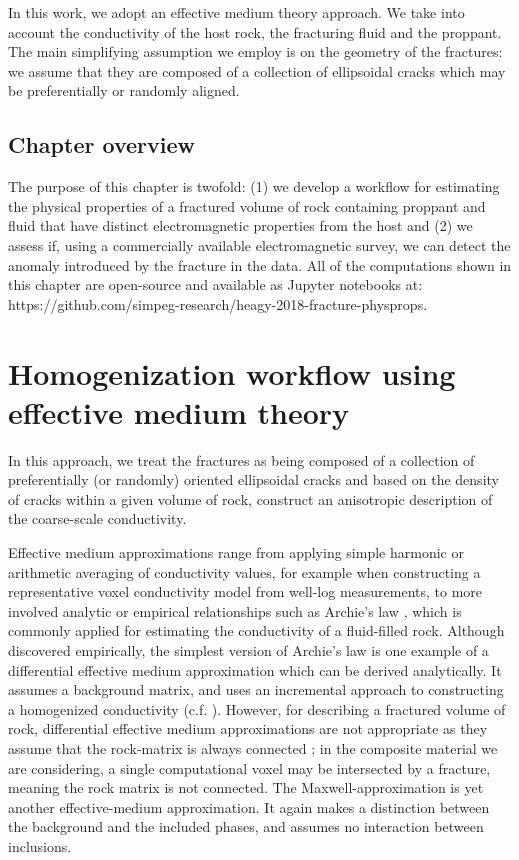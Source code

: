 In this work, we adopt an effective medium theory approach. We take into account the conductivity of the host rock, the fracturing fluid and the proppant. The main simplifying assumption we employ is on the geometry of the fractures: we assume that they are composed of a collection of ellipsoidal cracks which may be preferentially or randomly aligned.
\subsection{Chapter overview}
The purpose of this chapter is twofold: (1) we develop a workflow for estimating the physical properties of a fractured volume of rock containing proppant and fluid that have distinct electromagnetic properties from the host and (2) we assess if, using a commercially available electromagnetic survey, we can detect the anomaly introduced by the fracture in the data. All of the computations shown in this chapter are open-source and available as Jupyter notebooks at: https://github.com/simpeg-research/heagy-2018-fracture-physprops.

\section{Homogenization workflow using effective medium theory}

In this approach, we treat the fractures as being composed of a collection of preferentially (or randomly) oriented ellipsoidal cracks and based on the density of cracks within a given volume of rock, construct an anisotropic description of the coarse-scale conductivity.

Effective medium approximations range from applying simple harmonic or arithmetic averaging of conductivity values, for example when constructing a representative voxel conductivity model from well-log measurements, to more involved analytic or empirical relationships such as Archie’s law \citep{Archie1942}, which is commonly applied for estimating the conductivity of a fluid-filled rock. Although discovered empirically, the simplest version of Archie’s law is one example of a differential effective medium approximation which can be derived analytically. It assumes a background matrix, and uses an incremental approach to constructing a homogenized conductivity (c.f. \cite{Torquato2002, Milton2002}). However, for describing a fractured volume of rock, differential effective medium approximations are not appropriate as they assume that the rock-matrix is always connected \citep{Torquato2002}; in the composite material we are considering, a single computational voxel may be intersected by a fracture, meaning the rock matrix is not connected. The Maxwell-approximation \citep{Maxwell1873} is yet another effective-medium approximation. It again makes a distinction between the background and the included phases, and assumes no interaction between inclusions.

